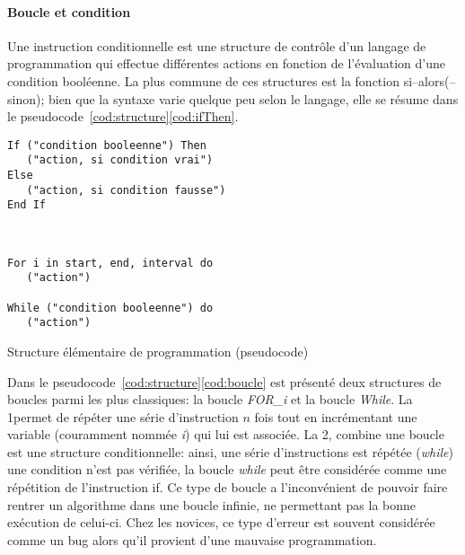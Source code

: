         \paragraph{Boucle et condition}
            Une instruction conditionnelle est une structure de contrôle d'un langage de programmation qui effectue différentes actions en fonction de l'évaluation d'une condition booléenne. La plus commune de ces structures est la fonction si–alors(–sinon); bien que la syntaxe varie quelque peu selon le langage, elle se résume dans le pseudocode~\ref{cod:structure}\ref{cod:ifThen}.
            \begin{code}
                \begin{minipage}{0.50\linewidth}
                    \begin{lstlisting}[language=LDA, basicstyle=\small]
If ("condition booleenne") Then
   ("action, si condition vrai")
Else
   ("action, si condition fausse")
End If
                    \end{lstlisting}
                \end{minipage}
                \vrule~~
                \begin{minipage}{0.48\linewidth}
                    \begin{lstlisting}[language=LDA, basicstyle=\small]
For i in start, end, interval do
   ("action") 

While ("condition booleenne") do
   ("action")
                    \end{lstlisting}
                \end{minipage}
                \caption{\label{cod:structure}Structure élémentaire de programmation (pseudocode)}
            \end{code}\par%
            Dans le pseudocode~\ref{cod:structure}\ref{cod:boucle} est présenté deux structures de boucles parmi les plus classiques: la boucle \textit{FOR\_i} et la boucle \textit{While}. La 1\iere permet de répéter une série d'instruction $n$ fois tout en incrémentant  une variable (couramment nommée \textit{i}) qui lui est associée. La 2\nde, combine une boucle est une structure conditionnelle: ainsi, une série d'instructions est répétée  (\textit{while}) une condition n'est pas vérifiée, la boucle \textit{while} peut être considérée comme une répétition de l'instruction if. Ce type de boucle a l'inconvénient de pouvoir faire rentrer un algorithme dans une boucle infinie, ne permettant pas la bonne exécution de celui-ci. Chez les novices, ce type d'erreur est souvent considérée comme un bug alors qu'il provient d'une mauvaise programmation.
